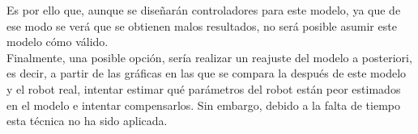 Es por ello que, aunque se diseñarán controladores para este modelo, ya que de ese modo se verá que se obtienen malos resultados, no será posible asumir este modelo cómo válido.\\

Finalmente, una posible opción, sería realizar un reajuste del modelo a posteriori, es decir, a partir de las gráficas en las que se compara la después de este modelo y el robot real, intentar estimar qué parámetros del robot están peor estimados en el modelo e intentar compensarlos. Sin embargo, debido a la falta de tiempo esta técnica no ha sido aplicada.
